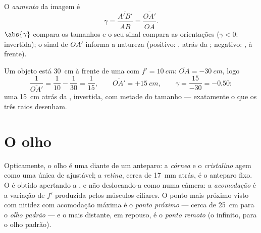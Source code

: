 \begin{definition}[Aumento]\label{def:g11:lenses-and-eye:magnification}
O \emph{aumento} da imagem é
\[
\gamma = \frac{\overline{A'B'}}{\overline{AB}}
       = \frac{\overline{OA'}}{\overline{OA}} .
\]
$\abs{\gamma}$ compara os tamanhos e o seu sinal compara as orientações
($\gamma < 0$: invertida); o sinal de $\overline{OA'}$ informa a natureza
(positivo: , atrás da ; negativo: , à frente).
\end{definition}

\begin{example}\label{ex:g11:lenses-and-eye:conjugate}
Um objeto está \qty{30}{cm} à frente de uma  com
$f' = \qty{10}{cm}$: $\overline{OA} = \qty{-30}{cm}$, logo
\[
\frac{1}{\overline{OA'}} = \frac{1}{10} - \frac{1}{30} = \frac{1}{15},
\qquad \overline{OA'} = +\qty{15}{cm},
\qquad \gamma = \frac{15}{-30} = -0.50 :
\]
uma  \qty{15}{cm} atrás da , invertida, com metade do
tamanho --- exatamente o que os três raios desenham.
\end{example}

\section{O olho}

\begin{definition}\label{def:g11:lenses-and-eye:eye}
Opticamente, o olho é uma  diante de um anteparo: a
\emph{córnea} e o \emph{cristalino} agem
como uma única  de  ajustável; a
\emph{retina}, cerca de \qty{17}{mm} atrás, é o anteparo
fixo. O  é obtido apertando a , e não deslocando-a como numa
câmera: a \emph{acomodação} é a variação de $f'$
produzida pelos músculos ciliares. O ponto mais próximo visto com nitidez
com acomodação máxima é o \emph{ponto próximo} ---
cerca de \qty{25}{cm} para o \emph{olho padrão} --- e
o mais distante, em repouso, é o \emph{ponto remoto}
(o infinito, para o olho padrão).
\end{definition}

